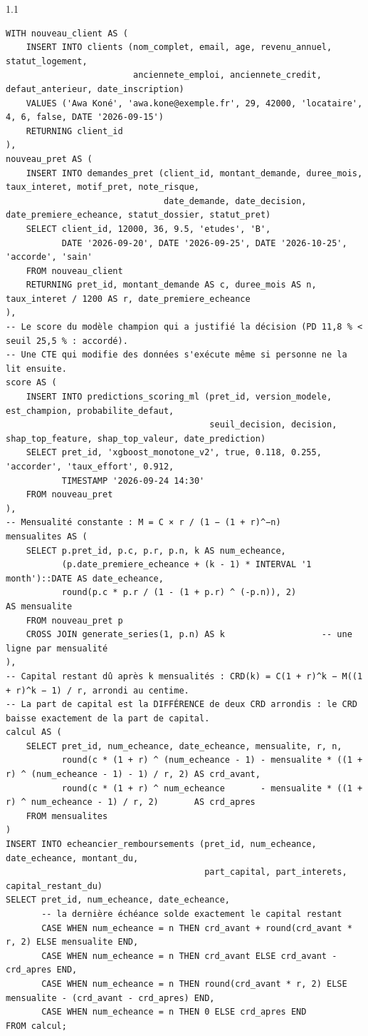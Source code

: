 \begin{correction}{1.1}
\begin{lstlisting}[style=long]
WITH nouveau_client AS (
    INSERT INTO clients (nom_complet, email, age, revenu_annuel, statut_logement,
                         anciennete_emploi, anciennete_credit, defaut_anterieur, date_inscription)
    VALUES ('Awa Koné', 'awa.kone@exemple.fr', 29, 42000, 'locataire', 4, 6, false, DATE '2026-09-15')
    RETURNING client_id
),
nouveau_pret AS (
    INSERT INTO demandes_pret (client_id, montant_demande, duree_mois, taux_interet, motif_pret, note_risque,
                               date_demande, date_decision, date_premiere_echeance, statut_dossier, statut_pret)
    SELECT client_id, 12000, 36, 9.5, 'etudes', 'B',
           DATE '2026-09-20', DATE '2026-09-25', DATE '2026-10-25', 'accorde', 'sain'
    FROM nouveau_client
    RETURNING pret_id, montant_demande AS c, duree_mois AS n, taux_interet / 1200 AS r, date_premiere_echeance
),
-- Le score du modèle champion qui a justifié la décision (PD 11,8 % < seuil 25,5 % : accordé).
-- Une CTE qui modifie des données s'exécute même si personne ne la lit ensuite.
score AS (
    INSERT INTO predictions_scoring_ml (pret_id, version_modele, est_champion, probabilite_defaut,
                                        seuil_decision, decision, shap_top_feature, shap_top_valeur, date_prediction)
    SELECT pret_id, 'xgboost_monotone_v2', true, 0.118, 0.255, 'accorder', 'taux_effort', 0.912,
           TIMESTAMP '2026-09-24 14:30'
    FROM nouveau_pret
),
-- Mensualité constante : M = C × r / (1 − (1 + r)^−n)
mensualites AS (
    SELECT p.pret_id, p.c, p.r, p.n, k AS num_echeance,
           (p.date_premiere_echeance + (k - 1) * INTERVAL '1 month')::DATE AS date_echeance,
           round(p.c * p.r / (1 - (1 + p.r) ^ (-p.n)), 2)                    AS mensualite
    FROM nouveau_pret p
    CROSS JOIN generate_series(1, p.n) AS k                   -- une ligne par mensualité
),
-- Capital restant dû après k mensualités : CRD(k) = C(1 + r)^k − M((1 + r)^k − 1) / r, arrondi au centime.
-- La part de capital est la DIFFÉRENCE de deux CRD arrondis : le CRD baisse exactement de la part de capital.
calcul AS (
    SELECT pret_id, num_echeance, date_echeance, mensualite, r, n,
           round(c * (1 + r) ^ (num_echeance - 1) - mensualite * ((1 + r) ^ (num_echeance - 1) - 1) / r, 2) AS crd_avant,
           round(c * (1 + r) ^ num_echeance       - mensualite * ((1 + r) ^ num_echeance - 1) / r, 2)       AS crd_apres
    FROM mensualites
)
INSERT INTO echeancier_remboursements (pret_id, num_echeance, date_echeance, montant_du,
                                       part_capital, part_interets, capital_restant_du)
SELECT pret_id, num_echeance, date_echeance,
       -- la dernière échéance solde exactement le capital restant
       CASE WHEN num_echeance = n THEN crd_avant + round(crd_avant * r, 2) ELSE mensualite END,
       CASE WHEN num_echeance = n THEN crd_avant ELSE crd_avant - crd_apres END,
       CASE WHEN num_echeance = n THEN round(crd_avant * r, 2) ELSE mensualite - (crd_avant - crd_apres) END,
       CASE WHEN num_echeance = n THEN 0 ELSE crd_apres END
FROM calcul;


\end{lstlisting}
\end{correction}
